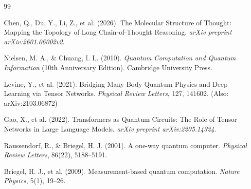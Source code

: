 \documentclass[11pt, a4paper]{article}
\begin{document}
\begin{thebibliography}{99}

Chen, Q., Du, Y., Li, Z., et al. (2026). The Molecular Structure of Thought: Mapping the Topology of Long Chain-of-Thought Reasoning. \textit{arXiv preprint arXiv:2601.06002v2}.

Nielsen, M. A., \& Chuang, I. L. (2010). \textit{Quantum Computation and Quantum Information} (10th Anniversary Edition). Cambridge University Press.

Levine, Y., et al. (2021). Bridging Many-Body Quantum Physics and Deep Learning via Tensor Networks. \textit{Physical Review Letters}, 127, 141602. (Also: arXiv:2103.06872)

Gao, X., et al. (2022). Transformers as Quantum Circuits: The Role of Tensor Networks in Large Language Models. \textit{arXiv preprint arXiv:2205.14324}.

Raussendorf, R., \& Briegel, H. J. (2001). A one-way quantum computer. \textit{Physical Review Letters}, 86(22), 5188--5191.

Briegel, H. J., et al. (2009). Measurement-based quantum computation. \textit{Nature Physics}, 5(1), 19--26.

\end{thebibliography}
\end{document}
